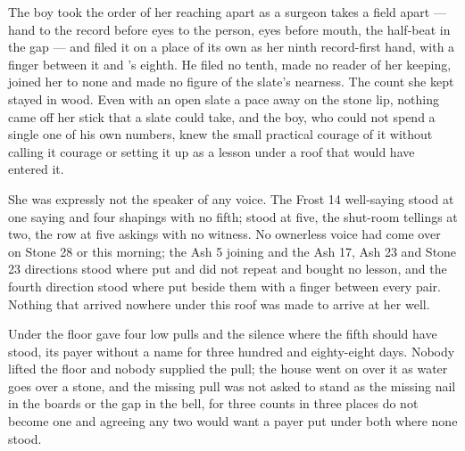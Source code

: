 The boy took the order of her reaching apart as a surgeon takes a field apart --- hand to the record before eyes to the person, eyes before mouth, the half-beat in the gap --- and filed it on a place of its own as her ninth record-first hand, with a finger between it and 's eighth. He filed no tenth, made no reader of her keeping, joined her to none and made no figure of the slate's nearness. The count she kept stayed in wood. Even with an open slate a pace away on the stone lip, nothing came off her stick that a slate could take, and the boy, who could not spend a single one of his own numbers, knew the small practical courage of it without calling it courage or setting it up as a lesson under a roof that would have entered it.

\scenebreak

She was expressly not the speaker of any voice. The Frost 14 well-saying stood at one saying and four shapings with no fifth;  stood at five, the shut-room tellings at two, the row at five askings with no witness. No ownerless voice had come over  on Stone 28 or this morning; the Ash 5 joining and the Ash 17, Ash 23 and Stone 23 directions stood where put and did not repeat and bought no lesson, and the fourth direction stood where put beside them with a finger between every pair. Nothing that arrived nowhere under this roof was made to arrive at her well.

Under the floor  gave four low pulls and the silence where the fifth should have stood, its payer without a name for three hundred and eighty-eight days. Nobody lifted the floor and nobody supplied the pull; the house went on over it as water goes over a stone, and the missing pull was not asked to stand as the missing nail in the boards or the gap in the bell, for three counts in three places do not become one and agreeing any two would want a payer put under both where none stood.

